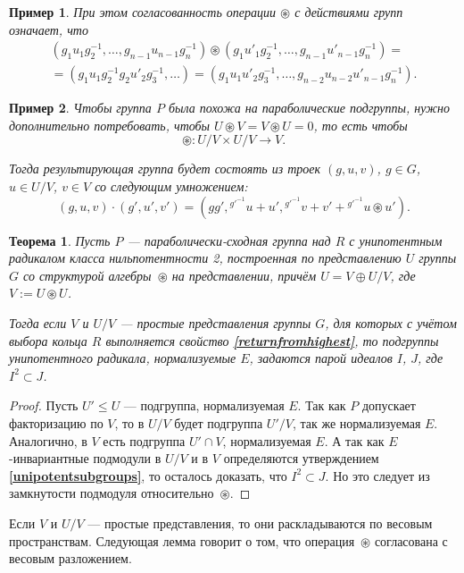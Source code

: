 \documentclass[12pt]{matmex-diploma}
\theoremstyle{mystyleni}
\theoremstyle{mystyle}
\newtheorem{thm}{Теорема}
\newtheorem{example}{Пример}
\newcommand\refb[1]{\textbf{\ref{#1}}}
\renewcommand{\le}{\leqslant}
\begin{document}
\begin{example}
При этом согласованность операции $\circledast$ с действиями групп означает, что
\begin{multline*}
(g_1 u_1 g_2^{-1}, \ldots, g_{n-1} u_{n-1} g_n^{-1}) \circledast (g_1 u'_1 g_2^{-1}, \ldots, g_{n-1} u'_{n-1} g_n^{-1}) 
= \\ =
(g_1 u_1 g_2^{-1} g_2 u'_2 g_3^{-1}, \ldots) = 
(g_1 u_1 u'_2 {g}_3^{-1}, \ldots, g_{n-2} u_{n-2} u'_{n-1} g_n^{-1}).
\end{multline*}
\end{example}

\begin{example}
Чтобы группа $P$ была похожа на параболические подгруппы, нужно дополнительно потребовать, чтобы $U \circledast V = V \circledast U = 0$, то есть чтобы
$$ \circledast : U/V \times U/V \to V.$$

Тогда результирующая группа будет состоять из троек $(g,u,v)$, $g \in G$, $u \in U/V$, $v \in V$ со следующим умножением:
$$
(g,u,v)\cdot (g',u',v') = (g g', {}^{g'^{-1}} u + u', {}^{g'^{-1}} v + v' + {}^{g'^{-1}} u \circledast u').
$$
\end{example}

\begin{thm}
Пусть $P$ --- параболически-сходная группа над $R$ с унипотентным радикалом класса нильпотентности 2, построенная по представлению $U$ группы $G$ со структурой алгебры~${\circledast}$ на представлении, причём  $U=V \oplus U/V$, где $V:=U\circledast U$.

Тогда если $V$ и $U/V$ --- простые представления группы $G$, для которых с учётом выбора кольца $R$ выполняется свойство \refb{returnfromhighest}, то подгруппы унипотентного радикала, нормализуемые $E$, задаются парой идеалов $I$, $J$, где $I^2 \subset J$.
\end{thm}
\begin{proof}
Пусть $U'\le U$ --- подгруппа, нормализуемая $E$. Так как $P$ допускает факторизацию по $V$, то в $U/V$ будет подгруппа $U'/V$, так же нормализуемая $E$. Аналогично, в $V$ есть подгруппа $U' \cap V$, нормализуемая $E$. А так как $E$-инвариантные подмодули в $U/V$ и в $V$ определяются утверждением \refb{unipotentsubgroups}, то осталось доказать, что $I^2 \subset J$. Но это следует из замкнутости подмодуля относительно~${\circledast}$.
\end{proof}

Если $V$ и $U/V$ --- простые представления, то они раскладываются по весовым пространствам. Следующая лемма говорит о том, что операция~${\circledast}$ согласована с весовым разложением.
\end{document}

